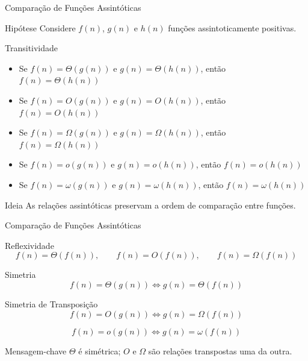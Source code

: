 \documentclass{beamer}
\begin{document}
\begin{frame}{Comparação de Funções Assintóticas}

\begin{block}{Hipótese}
Considere $f(n)$, $g(n)$ e $h(n)$ funções assintoticamente positivas.
\end{block}

\vspace{0.2cm}

\begin{block}{Transitividade}
\begin{itemize}
    \item Se $f(n) = \Theta(g(n))$ e $g(n) = \Theta(h(n))$, então $f(n) = \Theta(h(n))$
    \item Se $f(n) = O(g(n))$ e $g(n) = O(h(n))$, então $f(n) = O(h(n))$
    \item Se $f(n) = \Omega(g(n))$ e $g(n) = \Omega(h(n))$, então $f(n) = \Omega(h(n))$
    \item Se $f(n) = o(g(n))$ e $g(n) = o(h(n))$, então $f(n) = o(h(n))$
    \item Se $f(n) = \omega(g(n))$ e $g(n) = \omega(h(n))$, então $f(n) = \omega(h(n))$
\end{itemize}
\end{block}

\vspace{0.2cm}

\begin{alertblock}{Ideia}
As relações assintóticas preservam a ordem de comparação entre funções.
\end{alertblock}

\end{frame}
\begin{frame}{Comparação de Funções Assintóticas}
\small
\begin{block}{Reflexividade}
\[
f(n) = \Theta(f(n)), \qquad
f(n) = O(f(n)), \qquad
f(n) = \Omega(f(n))
\]
\end{block}


\begin{block}{Simetria}
\[
f(n) = \Theta(g(n))
\iff
g(n) = \Theta(f(n))
\]
\end{block}



\begin{block}{Simetria de Transposição}
\[
f(n) = O(g(n))
\iff
g(n) = \Omega(f(n))
\]

\[
f(n) = o(g(n))
\iff
g(n) = \omega(f(n))
\]
\end{block}


\begin{alertblock}{Mensagem-chave}
$\Theta$ é simétrica; $O$ e $\Omega$ são relações transpostas uma da outra.
\end{alertblock}

\end{frame}
\end{document}
